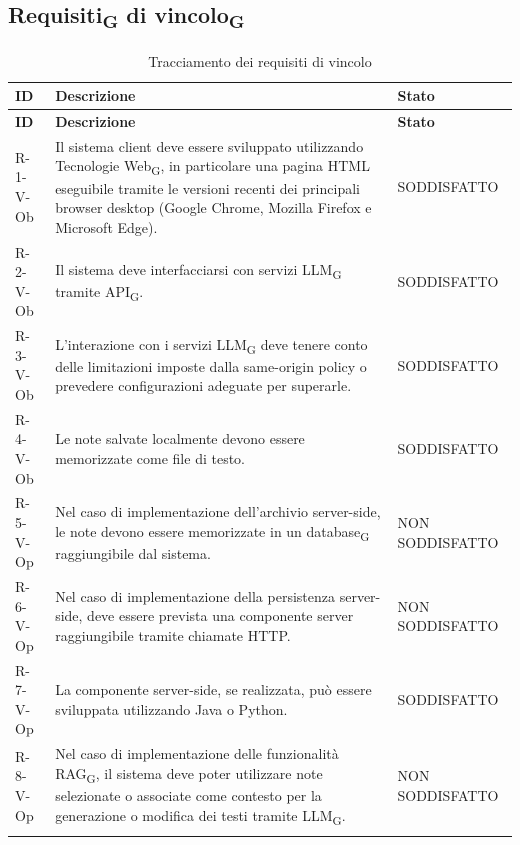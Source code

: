 \documentclass[a4paper, 10pt]{article}
\begin{document}
\subsection{Requisiti\textsubscript{G} di vincolo\textsubscript{G}}
\label{sec:tracciamento-vincolo}

\begin{longtable}{|p{2.1cm}|p{9.6cm}|p{2.6cm}|}
    \hline
    \rowcolor{gray!15}
    \textbf{ID} & \textbf{Descrizione} & \textbf{Stato} \\
    \hline
    \endfirsthead
    \hline
    \rowcolor{gray!15}
    \textbf{ID} & \textbf{Descrizione} & \textbf{Stato} \\
    \hline
    \endhead
    R-1-V-Ob & Il sistema client deve essere sviluppato utilizzando Tecnologie Web\textsubscript{G}, in particolare una pagina HTML eseguibile tramite le versioni recenti dei principali browser desktop (Google Chrome, Mozilla Firefox e Microsoft Edge). & SODDISFATTO \\ \hline
    R-2-V-Ob & Il sistema deve interfacciarsi con servizi LLM\textsubscript{G} tramite API\textsubscript{G}. & SODDISFATTO \\ \hline
    R-3-V-Ob & L'interazione con i servizi LLM\textsubscript{G} deve tenere conto delle limitazioni imposte dalla same-origin policy o prevedere configurazioni adeguate per superarle. & SODDISFATTO \\ \hline
    R-4-V-Ob & Le note salvate localmente devono essere memorizzate come file di testo. & SODDISFATTO \\ \hline
    R-5-V-Op & Nel caso di implementazione dell'archivio server-side, le note devono essere memorizzate in un database\textsubscript{G} raggiungibile dal sistema. & NON SODDISFATTO \\ \hline
    R-6-V-Op & Nel caso di implementazione della persistenza server-side, deve essere prevista una componente server raggiungibile tramite chiamate HTTP. & NON SODDISFATTO \\ \hline
    R-7-V-Op & La componente server-side, se realizzata, può essere sviluppata utilizzando Java o Python. & SODDISFATTO \\ \hline
    R-8-V-Op & Nel caso di implementazione delle funzionalità RAG\textsubscript{G}, il sistema deve poter utilizzare note selezionate o associate come contesto per la generazione o modifica dei testi tramite LLM\textsubscript{G}. & NON SODDISFATTO \\ \hline
    \caption{Tracciamento dei requisiti di vincolo}\label{tab:tracciamento-vincolo}
\end{longtable}
\end{document}
